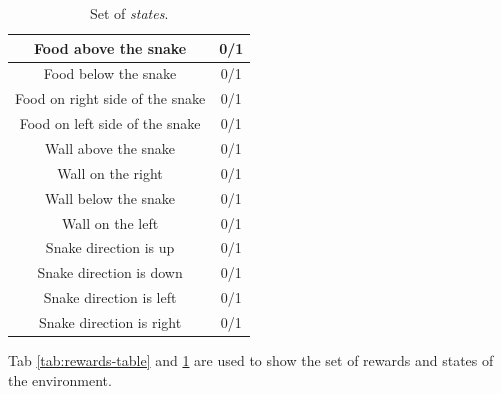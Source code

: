 \documentclass[11pt]{article}
\begin{document}
\begin{table}[ht]
\begin{center}
\begin{tabular}{ |c | c| }
\hline
 Food above the snake & 0/1  \\
\hline
    Food below the snake  & 0/1 \\
\hline
Food on right side of the snake & 0/1  \\
\hline
    Food on left side of the snake  & 0/1 \\
\hline
Wall above the snake & 0/1  \\
\hline
    Wall on the right  & 0/1 \\
\hline
Wall below the snake & 0/1  \\
\hline
    Wall on the left  & 0/1 \\
\hline
Snake direction is up & 0/1  \\
\hline
    Snake direction is down  & 0/1 \\
\hline
Snake direction is left & 0/1  \\
\hline
    Snake direction is right  & 0/1 \\
\hline
\end{tabular}
\end{center}
\label{tab:state-table}
\caption{Set of \textit{states}.}
\end{table}
Tab \ref{tab:rewards-table} and \ref{tab:state-table} are used to show the set of rewards and states of the environment.
\pagebreak
\end{document}
